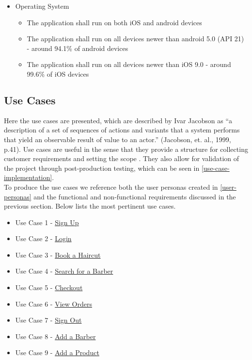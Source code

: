 \documentclass[12pt]{article}
\begin{document}
	\begin{itemize}
		\item Operating System
		\begin{itemize}
			\item The application shall run on both iOS and android devices
			\item The application shall run on all devices newer than android 5.0 (API 21) - around 94.1\% of android devices
			\item The application shall run on all devices newer than iOS 9.0 - around 99.6\% of iOS devices
		\end{itemize}
	\end{itemize}

	
	\subsection{Use Cases}
	\label{use-cases}
	Here the use cases are presented, which are described by Ivar Jacobson as “a description of a set of sequences of actions and variants that a system performs that yield an observable result of value to an actor.” (Jacobson, et. al., 1999, p.41). Use cases are useful in the sense that they provide a structure for collecting customer requirements and setting the scope \cite{larsonUseCasesWhat2004}. They also allow for validation of the project through post-production testing, which can be seen in \autoref{use-case-implementation}.
	\\
	
	To produce the use cases we reference both the user personas created in \autoref{user-personas} and the functional and non-functional requirements discussed in the previous section. Below lists the most pertinent use cases.

	\begin{itemize}
		\item Use Case 1 - \textcolor{blue}{\hyperref[chap:use-cases-1]{Sign Up}}
		\item Use Case 2 - \textcolor{blue}{\hyperref[chap:use-cases-2]{Login}}
		\item Use Case 3 - \textcolor{blue}{\hyperref[chap:use-cases-3]{Book a Haircut}}
		\item Use Case 4 - \textcolor{blue}{\hyperref[chap:use-cases-4]{Search for a Barber}}
		\item Use Case 5 - \textcolor{blue}{\hyperref[chap:use-cases-5]{Checkout}}
		\item Use Case 6 - \textcolor{blue}{\hyperref[chap:use-cases-6]{View Orders}}
		\item Use Case 7 - \textcolor{blue}{\hyperref[chap:use-cases-7]{Sign Out}}
		\item Use Case 8 - \textcolor{blue}{\hyperref[chap:use-cases-8]{Add a Barber}}
		\item Use Case 9 - \textcolor{blue}{\hyperref[chap:use-cases-9]{Add a Product}}
	\end{itemize}
	
\end{document}
